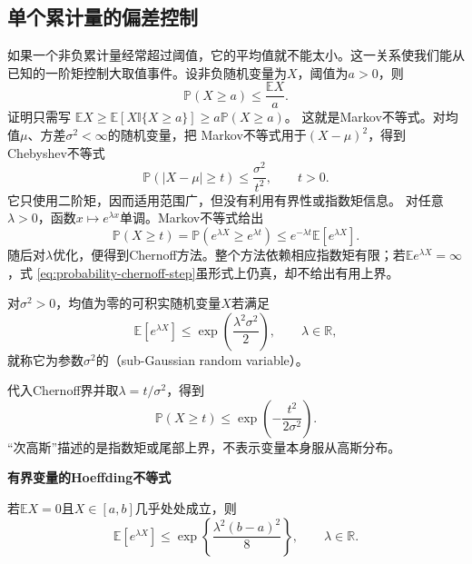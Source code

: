 \subsection{单个累计量的偏差控制}
\label{sec:probability-basic-tail-bounds}
\label{sec:probability-concentration-inequalities}

如果一个非负累计量经常超过阈值，它的平均值就不能太小。这一关系使我们能从已知的一阶矩控制大取值事件。设非负随机变量为\(X\)，阈值为\(a>0\)，则
\begin{equation}
  \mathbb{P}(X\geq a)
  \leq
  \frac{\mathbb{E}X}{a}.
  \label{eq:probability-markov-inequality}
\end{equation}
证明只需写
\(\mathbb{E}X\geq
\mathbb{E}[X\mathbb{I}\{X\geq a\}]
\geq a\mathbb{P}(X\geq a)\)。
这就是Markov不等式。对均值\(\mu\)、方差\(\sigma^2<\infty\)的随机变量，把
Markov不等式用于\((X-\mu)^2\)，得到Chebyshev不等式
\begin{equation}
  \mathbb{P}(|X-\mu|\geq t)
  \leq\frac{\sigma^2}{t^2},
  \qquad t>0.
  \label{eq:probability-chebyshev-inequality}
\end{equation}
它只使用二阶矩，因而适用范围广，但没有利用有界性或指数矩信息。
对任意\(\lambda>0\)，函数\(x\mapsto e^{\lambda x}\)单调。Markov不等式给出
\begin{equation}
  \mathbb{P}(X\geq t)
  =
  \mathbb{P}(e^{\lambda X}\geq e^{\lambda t})
  \leq
  e^{-\lambda t}\mathbb{E}[e^{\lambda X}].
  \label{eq:probability-chernoff-step}
\end{equation}
随后对\(\lambda\)优化，便得到Chernoff方法。整个方法依赖相应指数矩有限；若\(\mathbb{E}e^{\lambda X}=\infty\)，式
\eqref{eq:probability-chernoff-step}虽形式上仍真，却不给出有用上界。

\begin{definition}[次高斯变量]
  \label{def:probability-subgaussian}
对\(\sigma^2>0\)，均值为零的可积实随机变量\(X\)若满足
\[ \mathbb{E}[e^{\lambda X}]
  \leq\exp\left(\frac{\lambda^2\sigma^2}{2}\right),\qquad \lambda\in\mathbb{R}, \]
就称它为参数\(\sigma^2\)的（sub-Gaussian random variable）。
\end{definition}
代入Chernoff界并取\(\lambda=t/\sigma^2\)，得到
\[ \mathbb{P}(X\geq t)
  \leq\exp\left(-\frac{t^2}{2\sigma^2}\right). \]
“次高斯”描述的是指数矩或尾部上界，不表示变量本身服从高斯分布。

\par\medskip\noindent\textbf{有界变量的Hoeffding不等式}\quad
\begin{lemma}[Hoeffding引理]
\label{lem:probability-hoeffding-lemma}
若\(\mathbb{E}X=0\)且\(X\in[a,b]\)几乎处处成立，则
\[ \mathbb{E}[e^{\lambda X}]
  \leq\exp\left\{\frac{\lambda^2(b-a)^2}{8}\right\},\qquad \lambda\in\mathbb{R}. \]
\end{lemma}

